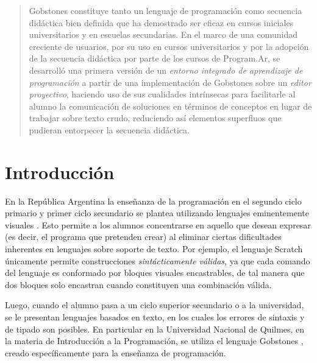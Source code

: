  
\nocite{CuadernoDocenteProgramAR}
\nocite{Maloney_scratch}
\nocite{Gobstones}
\nocite{voelter2014projectional}
\nocite{LanguageModularity}
\nocite{Gamma}
\nocite{TiposGobstones}
\nocite{DowekL11}
\nocite{Inquiry}



\begin{abstract}
Gobstones constituye tanto un lenguaje de programación como secuencia didáctica bien definida que ha demostrado ser eficaz en cursos iniciales universitarios y en escuelas secundarias. En el marco de una comunidad creciente de usuarios, por su uso en cursos universitarios y por la adopción de la secuencia didáctica por parte de los cursos de Program.Ar, se desarrolló una primera versión de un \emph{entorno integrado de aprendizaje de programación} a partir de una implementación de Gobstones sobre un \emph{editor proyectivo}, haciendo uso de sus cualidades intrínsecas para facilitarle al alumno la comunicación de soluciones en términos de conceptos en lugar de trabajar sobre texto crudo, reduciendo así elementos superfluos que pudieran entorpecer la secuencia didáctica.
\end{abstract}



\section{Introducción} \label{intro}

En la República Argentina la enseñanza de la programación en el segundo ciclo primario y primer ciclo secundario se plantea utilizando lenguajes eminentemente visuales \cite{CuadernoDocenteProgramAR}. Esto permite a los alumnos concentrarse en aquello que desean expresar (es decir, el programa que pretenden crear) al eliminar ciertas dificultades inherentes en lenguajes sobre soporte de texto. Por ejemplo, el lenguaje Scratch \cite{Maloney_scratch} únicamente permite construcciones \textit{sintácticamente válidas}, ya que cada comando del lenguaje es conformado por bloques visuales encastrables, de tal manera que dos bloques solo encastran cuando constituyen una combinación válida.

Luego, cuando el alumno pasa a un ciclo superior secundario o a la universidad, se le presentan lenguajes basados en texto, en los cuales los errores de sintaxis y de tipado son posibles. En particular en la Universidad Nacional de Quilmes, en la materia de Introducción a la Programación, se utiliza el lenguaje Gobstones \cite{Gobstones}, creado específicamente para la enseñanza de programación.

